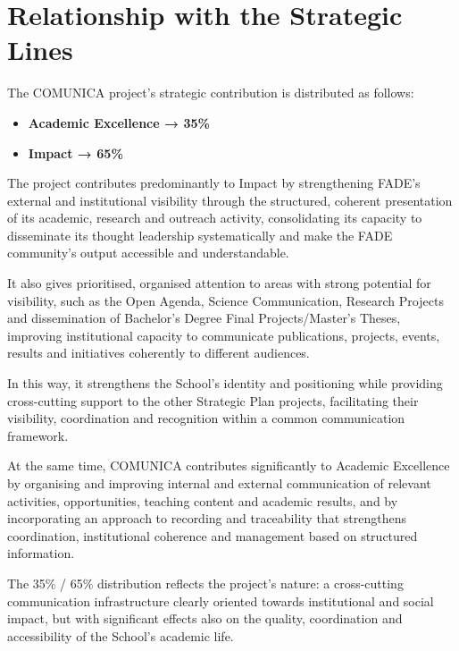 \documentclass[11pt,a4paper]{scrreprt}
\begin{document}
\section{Relationship with the Strategic Lines}

\small
The COMUNICA project's strategic contribution is distributed as follows:

\begin{itemize}[noitemsep,topsep=2pt]
\item \textbf{Academic Excellence → 35\%}
\item \textbf{Impact → 65\%}
\end{itemize}

The project contributes predominantly to Impact by strengthening FADE's external and institutional visibility through the structured, coherent presentation of its academic, research and outreach activity, consolidating its capacity to disseminate its thought leadership systematically and make the FADE community's output accessible and understandable.

It also gives prioritised, organised attention to areas with strong potential for visibility, such as the Open Agenda, Science Communication, Research Projects and dissemination of Bachelor's Degree Final Projects/Master's Theses, improving institutional capacity to communicate publications, projects, events, results and initiatives coherently to different audiences.

In this way, it strengthens the School's identity and positioning while providing cross-cutting support to the other Strategic Plan projects, facilitating their visibility, coordination and recognition within a common communication framework.

At the same time, COMUNICA contributes significantly to Academic Excellence by organising and improving internal and external communication of relevant activities, opportunities, teaching content and academic results, and by incorporating an approach to recording and traceability that strengthens coordination, institutional coherence and management based on structured information.

The 35\% / 65\% distribution reflects the project's nature: a cross-cutting communication infrastructure clearly oriented towards institutional and social impact, but with significant effects also on the quality, coordination and accessibility of the School's academic life.


\newpage
\end{document}
